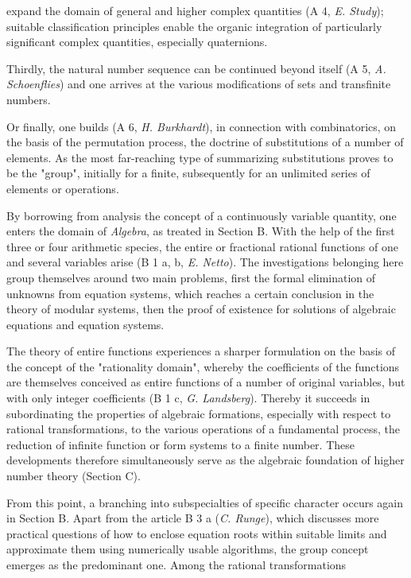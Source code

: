 \thispagestyle{fancy}

\vspace{0.5cm}

expand the domain of general and higher complex quantities (A 4, \textit{E. Study}); suitable classification principles enable the organic integration of particularly significant complex quantities, especially quaternions.

Thirdly, the natural number sequence can be continued beyond itself (A 5, \textit{A. Schoenflies}) and one arrives at the various modifications of sets and transfinite numbers.

Or finally, one builds (A 6, \textit{H. Burkhardt}), in connection with combinatorics, on the basis of the permutation process, the doctrine of substitutions of a number of elements. As the most far-reaching type of summarizing substitutions proves to be the "group", initially for a finite, subsequently for an unlimited series of elements or operations.

By borrowing from analysis the concept of a continuously variable quantity, one enters the domain of \textit{Algebra}, as treated in Section B. With the help of the first three or four arithmetic species, the entire or fractional rational functions of one and several variables arise (B 1 a, b, \textit{E. Netto}). The investigations belonging here group themselves around two main problems, first the formal elimination of unknowns from equation systems, which reaches a certain conclusion in the theory of modular systems, then the proof of existence for solutions of algebraic equations and equation systems.

The theory of entire functions experiences a sharper formulation on the basis of the concept of the "rationality domain", whereby the coefficients of the functions are themselves conceived as entire functions of a number of original variables, but with only integer coefficients (B 1 c, \textit{G. Landsberg}). Thereby it succeeds in subordinating the properties of algebraic formations, especially with respect to rational transformations, to the various operations of a fundamental process, the reduction of infinite function or form systems to a finite number. These developments therefore simultaneously serve as the algebraic foundation of higher number theory (Section C).

From this point, a branching into subspecialties of specific character occurs again in Section B. Apart from the article B 3 a (\textit{C. Runge}), which discusses more practical questions of how to enclose equation roots within suitable limits and approximate them using numerically usable algorithms, the group concept emerges as the predominant one. Among the rational transformations
